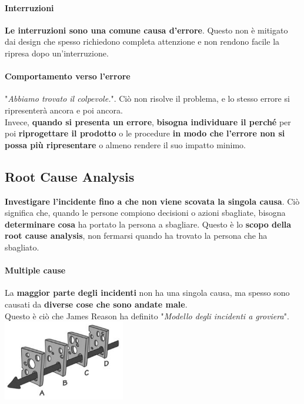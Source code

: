 \documentclass[10pt]{article}
\begin{document}
\paragraph{Interruzioni} \textbf{Le interruzioni sono una comune causa d'errore}. Questo non è mitigato dai design che spesso richiedono completa attenzione e non rendono facile la ripresa dopo un'interruzione.
\paragraph{Comportamento verso l'errore} "\textit{Abbiamo trovato il colpevole.}". Ciò non risolve il problema, e lo stesso errore si ripresenterà ancora e poi ancora.\\
Invece, \textbf{quando si presenta un errore}, \textbf{bisogna individuare il perché} per poi \textbf{riprogettare il prodotto} o le procedure \textbf{in modo che l'errore non si possa più ripresentare} o almeno rendere il suo impatto minimo.
\subsection{Root Cause Analysis}
\textbf{Investigare l'incidente fino a che non viene scovata la singola causa}. Ciò significa che, quando le persone compiono decisioni o azioni sbagliate, bisogna \textbf{determinare cosa} ha portato la persona a sbagliare. Questo è lo \textbf{scopo della root cause analysis}, non fermarsi quando ha trovato la persona che ha sbagliato.
\begin{multicols}{2}
\paragraph{Multiple cause} La \textbf{maggior parte degli incidenti} non ha una singola causa, ma spesso sono causati da \textbf{diverse cose che sono andate male}.\\
Questo è ciò che James Reason ha definito "\textit{Modello degli incidenti a groviera}".
\includegraphics[scale=1]{swisscheesmodel.png}
\end{multicols}
\pagebreak
\end{document}
